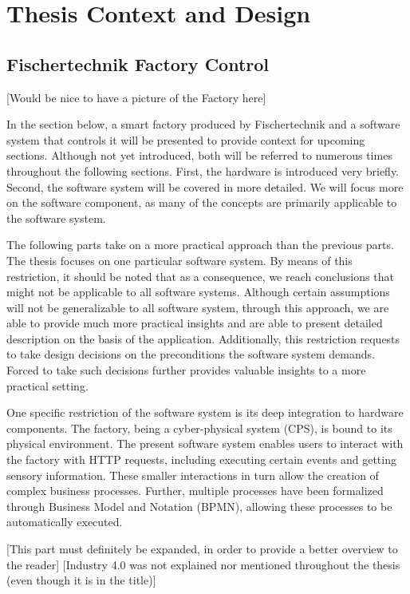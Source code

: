 \chapter{Thesis Context and Design}
\section{Fischertechnik Factory Control}

[Would be nice to have a picture of the Factory here]

In the section below, a smart factory produced by Fischertechnik and a software system that controls it will be presented to provide context for upcoming sections.
Although not yet introduced, both will be referred to numerous times throughout the following sections. First, the hardware is introduced very briefly. Second, the software system will be covered in more detailed. We will focus more on the software component, as many of the concepts are primarily applicable to the software system. 

The following parts take on a more practical approach than the previous parts. The thesis focuses on one particular software system. By means of this restriction, it should be noted that as a consequence, we reach conclusions that might not be applicable to all software systems. Although certain assumptions will not be generalizable to all software system, through this approach, we are able to provide much more practical insights and are able to present detailed description on the basis of the application. Additionally, this restriction requests to take design decisions on the preconditions the software system demands. Forced to take such decisions further provides valuable insights to a more practical setting.

One specific restriction of the software system is its deep integration to hardware components. The factory, being a cyber-physical system (CPS), is bound to its physical environment. The present software system enables users to interact with the factory with HTTP requests, including executing certain events and getting sensory information. These smaller interactions in turn allow the creation of complex business processes. Further, multiple processes have been formalized through Business Model and Notation (BPMN), allowing these processes to be automatically executed. 

[This part must definitely be expanded, in order to provide a better overview to the reader]
[Industry 4.0 was not explained nor mentioned throughout the thesis (even though it is in the title)]

